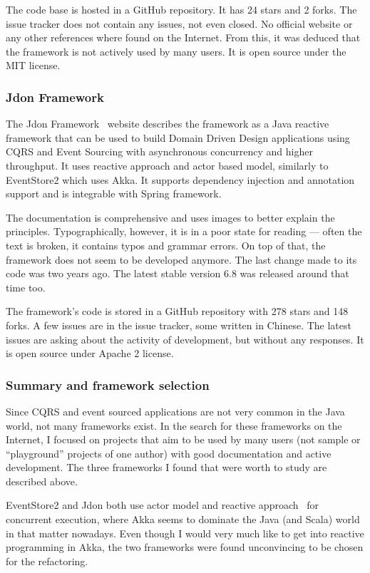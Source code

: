 \documentclass{book}
\begin{document}
The code base is hosted in a GitHub repository. It has 24 stars and 2
forks. The issue tracker does not contain any issues, not even closed.
No official website or any other references where found on the Internet.
From this, it was deduced that the framework is not actively used by
many users. It is open source under the MIT license.

\subsubsection{Jdon Framework}\label{jdon-framework}

The Jdon Framework~\cite{jdon} website describes the framework as a Java
reactive framework that can be used to build Domain Driven Design
applications using CQRS and Event Sourcing with asynchronous concurrency
and higher throughput. It uses reactive approach and actor based model,
similarly to EventStore2 which uses Akka. It supports dependency
injection and annotation support and is integrable with Spring
framework.

The documentation is comprehensive and uses images to better explain the
principles. Typographically, however, it is in a poor state for reading
--- often the text is broken, it contains typos and grammar errors. On
top of that, the framework does not seem to be developed anymore. The
last change made to its code was two years ago. The latest stable
version 6.8 was released around that time too.

The framework's code is stored in a GitHub repository with 278 stars and
148 forks. A few issues are in the issue tracker, some written in
Chinese. The latest issues are asking about the activity of development,
but without any responses. It is open source under Apache 2 license.

\subsubsection{Summary and framework
selection}\label{summary-and-framework-selection}

Since CQRS and event sourced applications are not very common in the
Java world, not many frameworks exist. In the search for these
frameworks on the Internet, I focused on projects that aim to be used by
many users (not sample or ``playground'' projects of one author) with
good documentation and active development. The three frameworks I found
that were worth to study are described above.

EventStore2 and Jdon both use actor model and reactive approach~\cite{actor} for concurrent execution, where Akka seems to dominate the
Java (and Scala) world in that matter nowadays. Even though I would very
much like to get into reactive programming in Akka, the two frameworks
were found unconvincing to be chosen for the refactoring.
\end{document}
